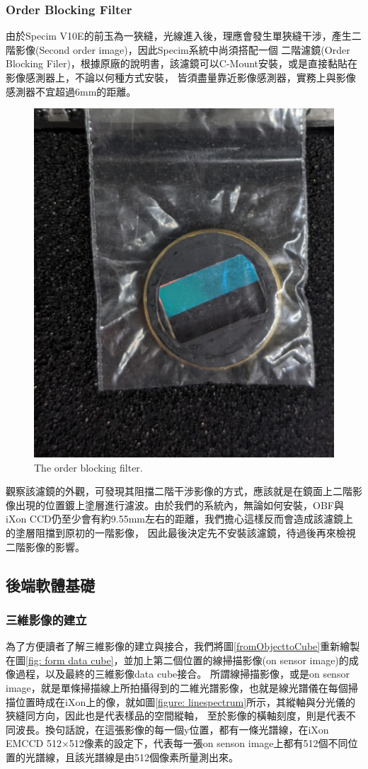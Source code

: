 \documentclass[12pt]{article}
\begin{document}
\subsubsection{Order Blocking Filter} \label{sec: OBF}
由於Specim V10E的前玉為一狹縫，光線進入後，理應會發生單狹縫干涉，產生二階影像(Second order image)，因此Specim系統中尚須搭配一個
二階濾鏡(Order Blocking Filer)，根據原廠的說明書，該濾鏡可以C-Mount安裝，或是直接黏貼在影像感測器上，不論以何種方式安裝，
皆須盡量靠近影像感測器，實務上與影像感測器不宜超過6mm的距離\cite{manual}。
\begin{figure}[h]
    \centering
    \includegraphics[width=0.5\linewidth]{PXL_20210723_094341395.jpg}
    \caption{The order blocking filter.}
    \label{figure: obf}
\end{figure}
觀察該濾鏡的外觀，可發現其阻擋二階干涉影像的方式，應該就是在鏡面上二階影像出現的位置鍍上塗層進行濾波。由於我們的系統內，無論如何安裝，OBF與iXon CCD仍至少會有約9.55mm左右的距離，我們擔心這樣反而會造成該濾鏡上的塗層阻擋到原初的一階影像，
因此最後決定先不安裝該濾鏡，待過後再來檢視二階影像的影響。

\subsection{後端軟體基礎}
\subsubsection{三維影像的建立}

為了方便讀者了解三維影像的建立與接合，我們將圖\ref{fromObjecttoCube}重新繪製在圖\ref{fig: form data cube}，並加上第二個位置的線掃描影像(on sensor image)的成像過程，以及最終的三維影像data cube接合。
所謂線掃描影像，或是on sensor image，就是單條掃描線上所拍攝得到的二維光譜影像，也就是線光譜儀在每個掃描位置時成在iXon上的像，就如圖\ref{figure: linespectrum}所示，其縱軸與分光儀的狹縫同方向，因此也是代表樣品的空間縱軸，
至於影像的橫軸刻度，則是代表不同波長。換句話說，在這張影像的每一個y位置，都有一條光譜線，在iXon EMCCD 512$\times$512像素的設定下，代表每一張on senson image上都有512個不同位置的光譜線，且該光譜線是由512個像素所量測出來。
\end{document}
